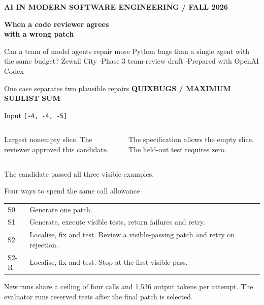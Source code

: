 \documentclass[aspectratio=169,11pt]{beamer}
\newcommand{\tagline}[1]{{\color{Teal}\small\bfseries #1}\par}
\newcommand{\bigvalue}[1]{{\fontsize{28}{31}\selectfont\bfseries #1}\par}
\begin{document}
\begin{frame}
\tagline{AI IN MODERN SOFTWARE ENGINEERING \quad / \quad FALL 2026}
\vspace{.45cm}
{\fontsize{29}{32}\selectfont\bfseries When a code reviewer agrees\\with a wrong patch\par}
\vspace{.5cm}
Can a team of model agents repair more Python bugs than a single agent with the same budget?
\vfill
{\small Zewail City \quad$\cdot$\quad Phase 3 team-review draft \quad$\cdot$\quad Prepared with OpenAI Codex}
\end{frame}

\begin{frame}{One case separates two plausible repairs}
\tagline{QUIXBUGS \enspace / \enspace MAXIMUM SUBLIST SUM}
\vspace{.45cm}
{\Large Input \quad\texttt{[-4, -4, -5]}}\par\vspace{.55cm}
\begin{columns}[T,onlytextwidth]
\column{.46\textwidth}\bigvalue{\color{Rust}$-4$}
Largest nonempty slice. The reviewer approved this candidate.
\column{.46\textwidth}\bigvalue{\color{Teal}$0$}
The specification allows the empty slice. The held-out test requires zero.
\end{columns}
\vspace{.55cm}
The candidate passed all three visible examples.
\end{frame}

\begin{frame}{Four ways to spend the same call allowance}
\renewcommand{\arraystretch}{1.46}
\begin{tabular}{@{}lp{10.5cm}@{}}\toprule
S0 & Generate one patch.\\
S1 & Generate, execute visible tests, return failures and retry.\\
S2 & Localise, fix and test. Review a visible-passing patch and retry on rejection.\\
S2-R & Localise, fix and test. Stop at the first visible pass.\\\bottomrule
\end{tabular}\par
\vspace{.45cm}
New runs share a ceiling of four calls and 1,536 output tokens per attempt. The evaluator runs reserved tests after the final patch is selected.
\end{frame}
\end{document}

